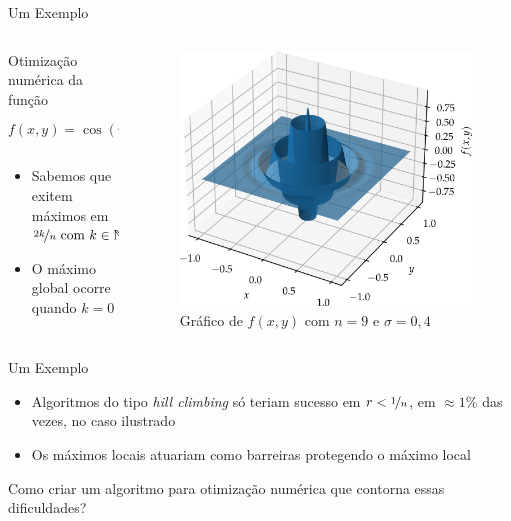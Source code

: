 \begin{frame}{Um Exemplo}
  \begin{columns}
    \begin{column}{0.6\textwidth}
      Otimização numérica da função
      $$ f(x,y) = \cos(n\pi r)\exp\left(-\frac{r^2}{\sigma^2}\right) $$
      \begin{itemize}
        \item Sabemos que exitem máximos em $ \nicefrac{2k}{n} \text{ com } k \in \mathbb{N} $
        \item O máximo global ocorre quando $ k = 0 $
      \end{itemize}
    \end{column}
    \begin{column}{0.4\textwidth}
      \begin{figure}
        \centering
        \includegraphics[width=\textwidth]{imagens/damped_cossine.png}
        \caption{Gráfico de $f(x, y)$ com $n = 9$ e $\sigma = 0,4$}
      \end{figure}
    \end{column}
  \end{columns}
\end{frame}

\begin{frame}{Um Exemplo}
  \begin{itemize}
    \item Algoritmos do tipo \textit{hill climbing} só teriam sucesso em
          $r < \nicefrac{1}{n}$, em $\approx 1\%$ das vezes, no caso ilustrado
    \item Os máximos locais atuariam como barreiras protegendo o máximo local
  \end{itemize}
  \vfill
  \begin{block}{}
    Como criar um algoritmo para otimização numérica que contorna essas dificuldades?
  \end{block}
\end{frame}

